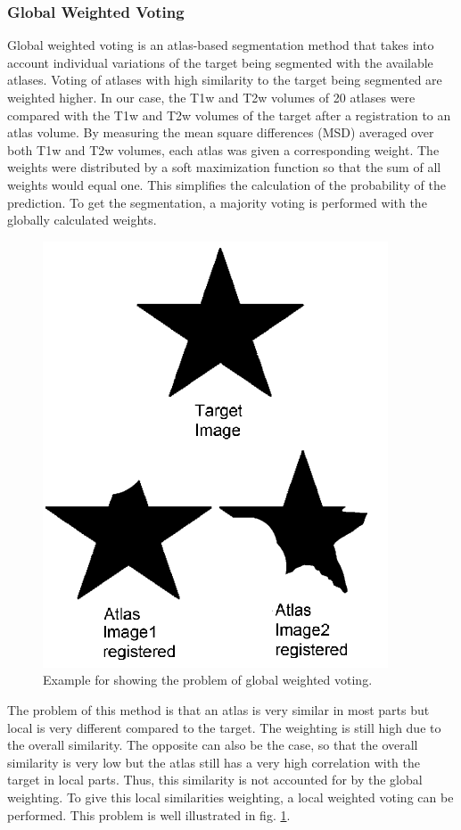 \subsubsection*{Global Weighted Voting}
Global weighted voting is an atlas-based segmentation method that takes into account individual variations of the target being segmented with the available atlases. Voting of atlases with high similarity to the target being segmented are weighted higher. In our case, the T1w and T2w volumes of 20 atlases were compared with the T1w and T2w volumes of the target after a registration to an atlas volume. By measuring the mean square differences (MSD) averaged over both T1w and T2w volumes, each atlas was given a corresponding weight.  The weights were distributed by a soft maximization function so that the sum of all weights would equal one. This simplifies the calculation of the probability of the prediction. To get the segmentation, a majority voting is performed with the globally calculated weights.

\begin{figure}[h!]
	\centering
	\includegraphics[width=0.5\linewidth]{img/globalWeightedProblematic}
	\caption{Example for showing the problem of global weighted voting\cite{Artaechevarria2009}.}
	\label{fig:globalweightedproblematic}
\end{figure}

The problem of this method is that an atlas is very similar in most parts but local is very different compared to the target. The weighting is still high due to the overall similarity. The opposite can also be the case, so that the overall similarity is very low but the atlas still has a very high correlation with the target in local parts. Thus, this similarity is not accounted for by the global weighting. To give this local similarities weighting, a local weighted voting can be performed. This problem is well illustrated in fig. \ref{fig:globalweightedproblematic}.

